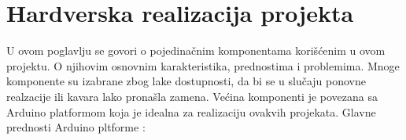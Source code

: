 \documentclass[a4paper, 12pt]{article}
\begin{document}
%
%

\pagebreak
\endgroup

\begingroup
\justifying
\section{Hardverska realizacija projekta}

\vspace{10pt}

U ovom poglavlju se govori o pojedinačnim komponentama korišćenim u ovom projektu. O njihovim osnovnim karakteristika, prednostima i problemima. Mnoge komponente su izabrane zbog lake dostupnosti, da bi se u slučaju ponovne realzacije ili kavara lako pronašla zamena. Većina komponenti je povezana sa Arduino platformom koja je idealna za realizaciju ovakvih projekata. Glavne prednosti Arduino pltforme :
\end{document}
